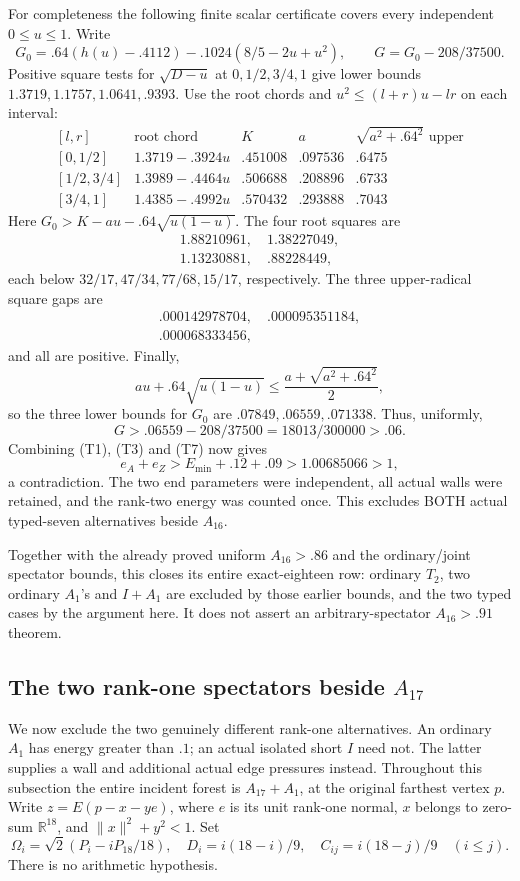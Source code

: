 \documentclass[11pt]{article}
\theoremstyle{definition}
\theoremstyle{remark}
\newcommand{\norm}[1]{\lVert #1\rVert}
\begin{document}
For completeness the following finite scalar certificate covers every
independent \(0\le u\le1\).  Write
\[
 G_0=.64(h(u)-.4112)-.1024(8/5-2u+u^2),\qquad
 G=G_0-208/37500.
\]
Positive square tests for \(\sqrt{D-u}\) at \(0,1/2,3/4,1\)
give lower bounds \(1.3719,1.1757,1.0641,.9393\).
Use the root chords and \(u^2\le(l+r)u-lr\) on each interval:
\[
\begin{array}{c|c|c|c|c}
{}[l,r]&\text{root chord}&K&a&\sqrt{a^2+.64^2}\text{ upper}\\ \hline
{}[0,1/2]&1.3719-.3924u&.451008&.097536&.6475\\
{}[1/2,3/4]&1.3989-.4464u&.506688&.208896&.6733\\
{}[3/4,1]&1.4385-.4992u&.570432&.293888&.7043
\end{array}
\]
Here \(G_0>K-au-.64\sqrt{u(1-u)}\).
The four root squares are
\[
\begin{gathered}
1.88210961,\quad1.38227049,\\
1.13230881,\quad .88228449,
\end{gathered}
\]
each below \(32/17,47/34,77/68,15/17\), respectively.
The three upper-radical square gaps are
\[
\begin{gathered}
.000142978704,\quad .000095351184,\\
.000068333456,
\end{gathered}
\]
and all are positive. Finally,
\[
 au+.64\sqrt{u(1-u)}\le\frac{a+\sqrt{a^2+.64^2}}2,
\]
so the three lower bounds for \(G_0\) are
\(.07849,.06559,.071338\). Thus, uniformly,
\[
               G>.06559-208/37500=18013/300000>.06.
\]
Combining (T1), (T3) and (T7) now gives
\[
 e_A+e_Z>E_{\min}+.12+.09>1.00685066>1,
\]
a contradiction.  The two end parameters were independent, all actual
walls were retained, and the rank-two energy was counted once.
This excludes BOTH actual typed-seven alternatives beside \(A_{16}\).

Together with the already proved uniform \(A_{16}>.86\) and the
ordinary/joint spectator bounds, this closes its entire exact-eighteen
row: ordinary \(T_2\), two ordinary \(A_1\)'s and \(I+A_1\)
are excluded by those earlier bounds, and the two typed cases by the
argument here.  It does not assert an arbitrary-spectator
\(A_{16}>.91\) theorem.

\subsection[The two rank-one spectators beside A17]{The two rank-one spectators beside \(A_{17}\)}
\label{app:A17rankone18}
We now exclude the two genuinely different rank-one alternatives.
An ordinary \(A_1\) has energy greater than \(.1\); an actual isolated
short \(I\) need not. The latter supplies a wall and additional actual
edge pressures instead. Throughout this subsection the entire incident
forest is \(A_{17}+A_1\), at the original farthest vertex \(p\).
Write \(z=E(p-x-ye)\), where \(e\) is its unit rank-one normal,
\(x\) belongs to zero-sum \(\mathbb R^{18}\), and
\(\norm x^2+y^2<1\). Set
\[
 \Omega_i=\sqrt2(P_i-iP_{18}/18),\quad
 D_i=i(18-i)/9,\quad C_{ij}=i(18-j)/9\quad(i\le j).
\]
There is no arithmetic hypothesis.
\end{document}
